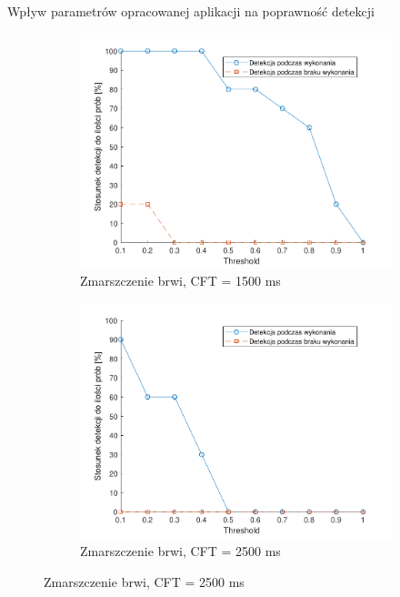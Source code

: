\documentclass[10pt,aspectratio=169]{beamer}
\begin{document}
\begin{frame}{Wpływ parametrów opracowanej aplikacji na poprawność detekcji}
\begin{figure}[htb]
\begin{subfigure}{0.3\linewidth}
    \includegraphics[width=\linewidth,keepaspectratio]{obrazy/frown1500}
    \caption{Zmarszczenie brwi, CFT = 1500 ms}
    \end{subfigure}\hspace*{\fill}
    \begin{subfigure}{0.3\linewidth}
    \includegraphics[width=\linewidth,keepaspectratio]{obrazy/frown2500}
    \caption{Zmarszczenie brwi, CFT = 2500 ms}
    \end{subfigure}
  \end{figure}
\end{frame}
\end{document}

